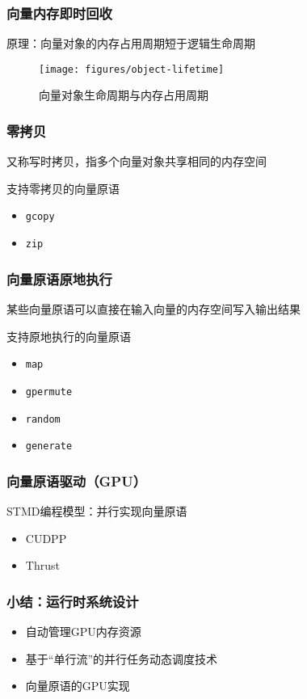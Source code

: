 \documentclass[]{beamer}
\begin{document}
\begin{frame}
  \frametitle{向量内存即时回收}
  原理：向量对象的内存占用周期短于逻辑生命周期
  \begin{figure}
    \centering
    \texttt{[image: figures/object-lifetime]}
    \caption{向量对象生命周期与内存占用周期}
  \end{figure}
\end{frame}

\begin{frame}
  \frametitle{零拷贝}
  又称写时拷贝，指多个向量对象共享相同的内存空间

  支持零拷贝的向量原语
  \begin{itemize}
    \item \texttt{gcopy}
    \item \texttt{zip}
  \end{itemize}
\end{frame}

\begin{frame}
  \frametitle{向量原语原地执行}
  某些向量原语可以直接在输入向量的内存空间写入输出结果

  支持原地执行的向量原语
  \begin{itemize}
    \item \texttt{map}
    \item \texttt{gpermute}
    \item \texttt{random}
    \item \texttt{generate}
  \end{itemize}
\end{frame}

\begin{frame}
  \frametitle{向量原语驱动（GPU）}
  STMD编程模型：并行实现向量原语
  \begin{itemize}
    \item CUDPP
    \item Thrust
  \end{itemize}
\end{frame}

\begin{frame}
  \frametitle{小结：运行时系统设计}
  \begin{itemize}
    \item 自动管理GPU内存资源
    \item 基于“单行流”的并行任务动态调度技术
    \item 向量原语的GPU实现
  \end{itemize}
\end{frame}
\end{document}
